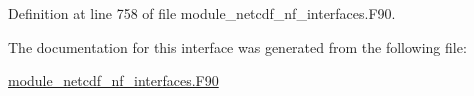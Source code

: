 Definition at line 758 of file module\+\_\+netcdf\+\_\+nf\+\_\+interfaces.\+F90.



The documentation for this interface was generated from the following file\+:\begin{DoxyCompactItemize}
\item 
\hyperlink{module__netcdf__nf__interfaces_8F90}{module\+\_\+netcdf\+\_\+nf\+\_\+interfaces.\+F90}\end{DoxyCompactItemize}
